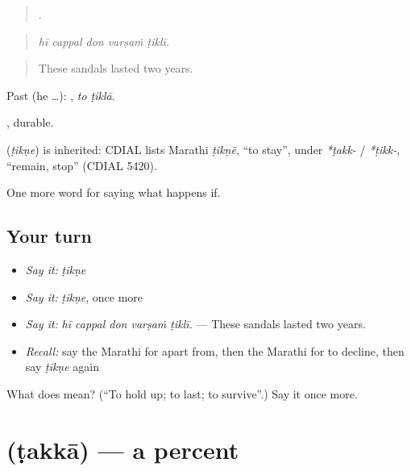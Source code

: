 \begin{quote}
    .
\end{quote}

\begin{quote}
\emph{hī cappal don varṣaṁ ṭiklī.}
\end{quote}

\begin{quote}
These sandals lasted two years.
\end{quote}

Past (he …):  , \emph{to ṭiklā}.

, durable.

\begin{cousinweb}
\textbf{} (\emph{ṭikṇe}) is inherited: CDIAL lists Marathi \emph{ṭikṇẽ}, \textquotedblleft{}to stay\textquotedblright{}, under \emph{*ṭakk-} / \emph{*ṭikk-}, \textquotedblleft{}remain, stop\textquotedblright{} (CDIAL 5420).
\end{cousinweb}

\begin{grammarlens}[title={What you've built}]
One more word for saying what happens if.
\end{grammarlens}

\subsection*{Your turn}
\begin{itemize}
\raggedright
  \item \emph{Say it:} \emph{ṭikṇe}
  \item \emph{Say it:} \emph{ṭikṇe}, once more
  \item \emph{Say it:} \emph{hī cappal don varṣaṁ ṭiklī.} — These sandals lasted two years.
  \item \emph{Recall:} say the Marathi for apart from, then the Marathi for to decline, then say \emph{ṭikṇe} again
\end{itemize}

\begin{tcolorbox}[breakable,colback=teal!4,colframe=teal!35!black,title={Before you move on}]
What does  mean? (\textquotedblleft{}To hold up; to last; to survive\textquotedblright{}.) Say it once more.
\end{tcolorbox}
\section[\texorpdfstring{\mr{टक्का} (ṭakkā)}{टक्का (ṭakkā)}]{ (ṭakkā) — a percent}

